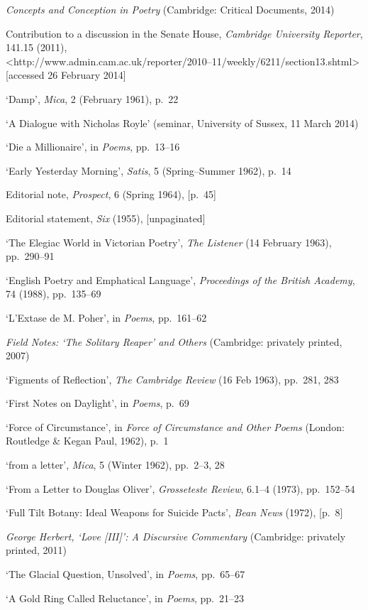 \documentclass[]{article}
\begin{document}
\emph{Concepts and Conception in Poetry} (Cambridge: Critical Documents,
2014)

Contribution to a discussion in the Senate House, \emph{Cambridge
University Reporter}, 141.15 (2011),\\
\textless{}http://www.admin.cam.ac.uk/reporter/2010--11/weekly/6211/section13.shtml\textgreater{}
{[}accessed 26 February 2014{]}

`Damp', \emph{Mica}, 2 (February 1961), p.~22

`A Dialogue with Nicholas Royle' (seminar, University of Sussex, 11
March 2014)

`Die a Millionaire', in \emph{Poems}, pp.~13--16

`Early Yesterday Morning', \emph{Satis}, 5 (Spring--Summer 1962), p.~14

Editorial note, \emph{Prospect}, 6 (Spring 1964), {[}p.~45{]}

Editorial statement, \emph{Six} (1955), {[}unpaginated{]}

`The Elegiac World in Victorian Poetry', \emph{The Listener} (14
February 1963), pp.~290--91

`English Poetry and Emphatical Language', \emph{Proceedings of the
British Academy}, 74 (1988), pp.~135--69

`L'Extase de M. Poher', in \emph{Poems}, pp.~161--62

\emph{Field Notes: `The Solitary Reaper' and Others} (Cambridge:
privately printed, 2007)

`Figments of Reflection', \emph{The Cambridge Review} (16 Feb 1963),
pp.~281, 283

`First Notes on Daylight', in \emph{Poems}, p.~69

`Force of Circumstance', in \emph{Force of Circumstance and Other Poems}
(London: Routledge \& Kegan Paul, 1962), p.~1

`from a letter', \emph{Mica}, 5 (Winter 1962), pp.~2--3, 28

`From a Letter to Douglas Oliver', \emph{Grosseteste Review}, 6.1--4
(1973), pp.~152--54

`Full Tilt Botany: Ideal Weapons for Suicide Pacts', \emph{Bean News}
(1972), {[}p.~8{]}

\emph{George Herbert, `Love {[}III{]}': A Discursive Commentary}
(Cambridge: privately printed, 2011)

`The Glacial Question, Unsolved', in \emph{Poems}, pp.~65--67

`A Gold Ring Called Reluctance', in \emph{Poems}, pp.~21--23
\end{document}
